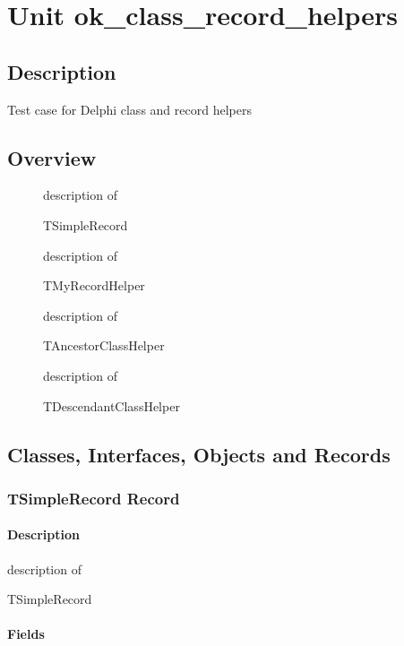 \documentclass{report}
\begin{document}
\newlength{\tmplength}
\chapter{Unit ok{\_}class{\_}record{\_}helpers}
\section{Description}
Test case for Delphi class and record helpers
\section{Overview}
\begin{description}
\item[\texttt{\begin{ttfamily}TSimpleRecord\end{ttfamily} Record}]description of \begin{ttfamily}TSimpleRecord\end{ttfamily}
\item[\texttt{\begin{ttfamily}TMyRecordHelper\end{ttfamily} Record}]description of \begin{ttfamily}TMyRecordHelper\end{ttfamily}
\item[\texttt{\begin{ttfamily}TAncestorClassHelper\end{ttfamily} Class}]description of \begin{ttfamily}TAncestorClassHelper\end{ttfamily}
\item[\texttt{\begin{ttfamily}TDescendantClassHelper\end{ttfamily} Class}]description of \begin{ttfamily}TDescendantClassHelper\end{ttfamily}
\end{description}
\section{Classes, Interfaces, Objects and Records}
\subsection*{TSimpleRecord Record}
\subsubsection*{\large{\textbf{Description}}\normalsize\hspace{1ex}\hfill}
description of \begin{ttfamily}TSimpleRecord\end{ttfamily}\subsubsection*{\large{\textbf{Fields}}\normalsize\hspace{1ex}\hfill}
\end{document}
